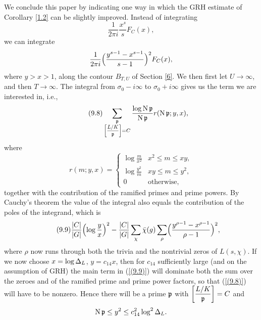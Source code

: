 \documentclass[./main]{subfiles}
\begin{document}
We conclude this paper by indicating one way in which the GRH estimate  of Corollary \ref{1.2} can be slightly improved.
Instead of integrating
\[
\frac{1}{2\pi i} \frac{x^s}{s} F_C(x),
\]
we can integrate
\[
\frac{1}{2\pi i} \Bigl(\frac{y^{s-1} - x^{s-1}}{s - 1}\Bigr)^{2} F_C(x),
\]
where $y > x > 1$,
along the contour $B_{T, U}$ of Section \ref{6}.
We then first let $U \to \infty$, and then $T \to \infty$.
The integral from $\sigma_0 - i\infty$ to $\sigma_0 + i \infty$ gives us the term we are interested in, i.e.,
\[\tag{9.8}\label{(9.8)}
\sum_{\substack{\p \\\Scale[0.75]{\ArtinSymbol{L/K}{\p}}=C}} \frac{\log \norm \p}{\norm \p} r(\norm \p; y, x),
\]
where
\[
r(m;y, x) = \begin{cases} \log \frac{m}{x^2} & x^2 \leq m \leq xy, \\ \log \frac{y^2}{m} & xy \leq m \leq y^2, \\ 0 & \text{otherwise}, \end{cases}
\]
together with the contribution of the ramified primes and prime powers.
By Cauchy's theorem the value of the integral also equals the contribution of the poles of the integrand, which is
\[\tag{9.9}\label{(9.9)}
\frac{|C|}{|G|} \Bigl(\log \frac{y}{x}\Bigr)^2 - \frac{|C|}{|G|} \sum_{\chi} \bar{\chi}(g) \sum_{\rho} \Bigl(\frac{y^{\rho - 1} - x^{\rho - 1}}{\rho - 1}\Bigr)^2,
\]
where $\rho$ now runs through both the trivia and the nontrivial zeros of $L(s, \chi)$.
If we now choose $x = \log \Delta_L $, $y = c_{14}x$, then for $c_{14}$ sufficiently large (and on the assumption of GRH) the main term in (\ref{(9.9)}) will dominate both the sum over the zeroes and of the ramified prime and prime power factors, so that (\ref{(9.8)}) will have to be nonzero.
Hence there will be a prime $\mathfrak{p}$ with $\bigg[\dfrac{L/K}{\mathfrak{p}}\bigg] = C$ and
\[
\operatorname{N} \mathfrak{p} \leq y^2 \leq c_{14}^2 \log^2 \Delta_L .
\]

\end{document}

